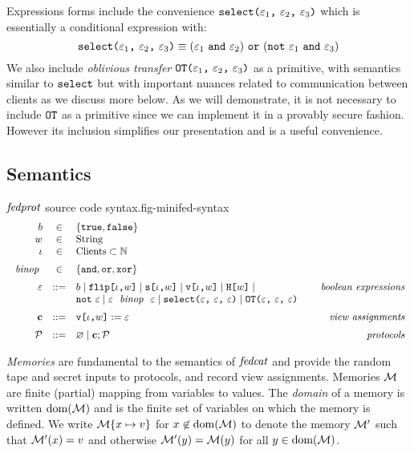 Expressions forms include the convenience
$\texttt{select(} \varepsilon_1 \texttt{,}\ \varepsilon_2 \texttt{,}\ \varepsilon_3 \texttt{)}$ which is essentially a conditional
expression with:
$$
\texttt{select(} \varepsilon_1 \texttt{,}\ \varepsilon_2 \texttt{,}\ \varepsilon_3 \texttt{)} \equiv (\varepsilon_1\ \texttt{and}\ \varepsilon_2)\ \texttt{or}\ (\texttt{not}\ \varepsilon_1\ \texttt{and}\ \varepsilon_3)
$$
We also include \emph{oblivious transfer} $\texttt{OT(} \varepsilon_1 \texttt{,}\ \varepsilon_2 \texttt{,}\ \varepsilon_3 \texttt{)}$ as a primitive,
with semantics similar to $\texttt{select}$ but with important nuances
related to communication between clients as we discuss more below.
As we will demonstrate, it is not necessary to include $\texttt{OT}$
as a primitive since we can implement it in a provably secure
fashion. However its inclusion simplifies our presentation and is a useful
convenience.

\subsection{Semantics}

\begin{fpfig}[t]{$\mathit{fedprot}$ source code syntax.}{fig-minifed-syntax}
$$
\begin{array}{rcl@{\hspace{8mm}}r}
b &\in& \{ \etrue, \efalse \} \\
w &\in& \mathrm{String} \\ 
\cid &\in& \mathrm{Clients} \subset  \mathbb{N} \\[2mm]%
\bop &\in& \{ \eand, \eor, \exor \} \\[2mm]
\be &::=& b \mid \flip{\cid}{w} \mid \secret{\cid}{w} \mid \view{\cid}{w} \mid \oracle{w} \mid & \textit{boolean expressions}\\
& &  \enot\ \be \mid \be\ \bop\ \be \mid \select{\be}{\be}{\be} \mid \OT{\be}{\be}{\be} \\[2mm]
\instr &::=& \eassign{\view{\cid}{w}}{\be} & \textit{view assignments} \\[2mm]
\prog &::=& \varnothing \mid \instr; \prog & \textit{protocols}
\end{array}
$$ 
\end{fpfig}

\emph{Memories} are fundamental to the semantics of $\mathit{fedcat}$ and
provide the random tape and secret inputs to protocols, and record
view assignments. Memories $\mathcal{M}$ are finite (partial) mapping from
variables to values. The \emph{domain} of a memory is written
$\mathrm{dom}(\mathcal{M})$ and is the finite set of variables on which the memory
is defined. We write $\mathcal{M}\{ x \mapsto v\}$ for
$x\not\in\mathrm{dom}(\mathcal{M})$ to denote the memory $\mathcal{M}'$ such that
$\mathcal{M}'(x) = v$ and otherwise $\mathcal{M}'(y) = \mathcal{M}(y)$ for all $y \in
\mathrm{dom}(\mathcal{M})$. 

